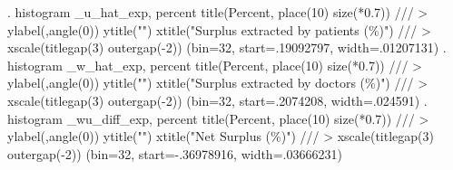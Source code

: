 . histogram _u_hat_exp, percent title(Percent, place(10) size(*0.7))               ///
>            ylabel(,angle(0)) ytitle("") xtitle("Surplus extracted by patients (\%)") ///
>            xscale(titlegap(3) outergap(-2))
(bin=32, start=.19092797, width=.01207131)
{\smallskip}
. histogram _w_hat_exp, percent title(Percent, place(10) size(*0.7))               ///
>            ylabel(,angle(0)) ytitle("") xtitle("Surplus extracted by doctors (\%)")  ///
>            xscale(titlegap(3) outergap(-2))
(bin=32, start=.2074208, width=.024591)
{\smallskip}
. histogram _wu_diff_exp, percent title(Percent, place(10) size(*0.7))             ///
>            ylabel(,angle(0)) ytitle("") xtitle("Net Surplus (\%)")                   ///
>            xscale(titlegap(3) outergap(-2))
(bin=32, start=-.36978916, width=.03666231)
